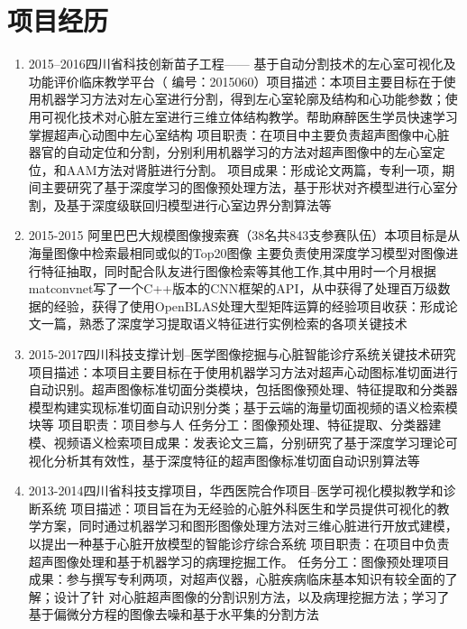 \section*{项目经历}
\begin{enumerate}
\item {2015–2016}{四川省科技创新苗子工程—— 基于自动分割技术的左心室可视化及功能评价临床教学平台}{\textnormal{（ 编号：2015060）}}{\newline 项目描述：本项目主要目标在于使用机器学习方法对左心室进行分割，得到左心室轮廓及结构和心功能参数；使用可视化技术对心脏左室进行三维立体结构教学。帮助麻醉医生学员快速学习掌握超声心动图中左心室结构}
{ \newline 项目职责：在项目中主要负责超声图像中心脏器官的自动定位和分割，分别利用机器学习的方法对超声图像中的左心室定位，和AAM方法对肾脏进行分割。 \newline 项目成果：形成论文两篇，专利一项，期间主要研究了基于深度学习的图像预处理方法，基于形状对齐模型进行心室分割，及基于深度级联回归模型进行心室边界分割算法等}{}  

\item{2015-2015}{ 阿里巴巴大规模图像搜索赛（38名共843支参赛队伍）}{\textnormal{\newline 本项目标是从海量图像中检索最相同或似的Top20图像 }}{ \newline 主要负责使用深度学习模型对图像进行特征抽取，同时配合队友进行图像检索等其他工作,其中用时一个月根据matconvnet写了一个C++版本的CNN框架的API，从中获得了处理百万级数据的经验，获得了使用OpenBLAS处理大型矩阵运算的经验}{\newline 项目收获：形成论文一篇，熟悉了深度学习提取语义特征进行实例检索的各项关键技术}{}

\item{2015-2017}{四川科技支撑计划--医学图像挖掘与心脏智能诊疗系统关键技术研究}{\textnormal{ \newline 项目描述：本项目主要目标在于使用机器学习方法对超声心动图标准切面进行自动识别。超声图像标准切面分类模块，包括图像预处理、特征提取和分类器模型构建实现标准切面自动识别分类；基于云端的海量切面视频的语义检索模块等}}
{\newline 项目职责：项目参与人 \newline 任务分工：图像预处理、特征提取、分类器建模、视频语义检索}{\newline 项目成果：发表论文三篇，分别研究了基于深度学习理论可视化分析其有效性，基于深度特征的超声图像标准切面自动识别算法等}{}

\item{2013-2014}{四川省科技支撑项目，华西医院合作项目–医学可视化模拟教学和诊断系统}{\textnormal{ \newline 项目描述：项目旨在为无经验的心脏外科医生和学员提供可视化的教学方案，同时通过机器学习和图形图像处理方法对三维心脏进行开放式建模，以提出一种基于心脏开放模型的智能诊疗综合系统}}
{\newline 项目职责：在项目中负责超声图像处理和基于机器学习的病理挖掘工作。 \newline 任务分工：图像预处理}{\newline 项目成果：参与撰写专利两项，对超声仪器，心脏疾病临床基本知识有较全面的了解；设计了针
对心脏超声图像的分割识别方法，以及病理挖掘方法；学习了基于偏微分方程的图像去噪和基于水平集的分割方法}{}

\end{enumerate}
